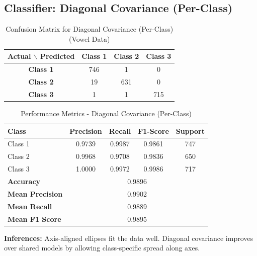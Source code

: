 \subsection{Classifier: Diagonal Covariance (Per-Class)}


\begin{table}[H]
\centering
\caption{Confusion Matrix for Diagonal Covariance (Per-Class) (Vowel Data)}
\label{tab:confmat_d3_sigma2I}
\begin{tabular}{|c|c|c|c|}
\hline
\textbf{Actual $\backslash$ Predicted} & \textbf{Class 1} & \textbf{Class 2} & \textbf{Class 3} \\
\hline
\textbf{Class 1} & 746 & 1   & 0   \\
\textbf{Class 2} & 19  & 631 & 0   \\
\textbf{Class 3} & 1   & 1   & 715 \\
\hline
\end{tabular}
\end{table}

\begin{table}[H]
\centering
\caption{Performance Metrics - Diagonal Covariance (Per-Class)}
\begin{tabular}{lcccc}
\toprule
\textbf{Class} & \textbf{Precision} & \textbf{Recall} & \textbf{F1-Score} & \textbf{Support} \\
\midrule
Class 1 & 0.9739 & 0.9987 & 0.9861 & 747 \\
Class 2 & 0.9968 & 0.9708 & 0.9836 & 650 \\
Class 3 & 1.0000 & 0.9972 & 0.9986 & 717 \\
\midrule
\textbf{Accuracy} & \multicolumn{4}{c}{0.9896} \\
\textbf{Mean Precision} & \multicolumn{4}{c}{0.9902} \\
\textbf{Mean Recall} & \multicolumn{4}{c}{0.9889} \\
\textbf{Mean F1 Score} & \multicolumn{4}{c}{0.9895} \\
\bottomrule
\end{tabular}
\end{table}

\textbf{Inferences:} Axis-aligned ellipses fit the data well. Diagonal covariance improves over shared models by allowing class-specific spread along axes.


